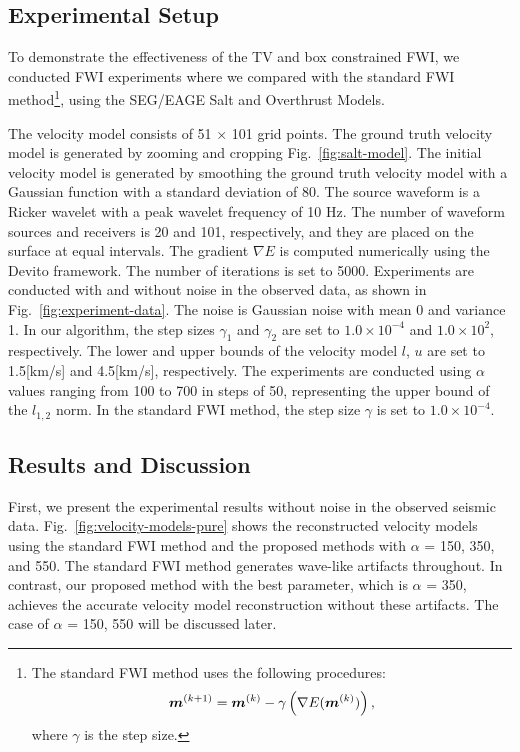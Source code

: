 \subsection{Experimental Setup} \label{subsec:experimental-setup}

To demonstrate the effectiveness of the TV and box constrained FWI, we conducted FWI experiments where we compared with the standard FWI method\footnote{
    \parbox{\linewidth}{The standard FWI method uses the following procedures:
        \begin{equation} \label{eq:FWIWithGradient} \FWIWithGradient, \end{equation}
        where $\gamma$ is the step size.}
}\cite{FWI0}, using the SEG/EAGE Salt and Overthrust Models.

The velocity model consists of 51 $\times$ 101 grid points.
The ground truth velocity model is generated by zooming and cropping Fig.~\ref{fig:salt-model}.
The initial velocity model is generated by smoothing the ground truth velocity model with a Gaussian function with a standard deviation of 80.
The source waveform is a Ricker wavelet with a peak wavelet frequency of 10 Hz.
The number of waveform sources and receivers is 20 and 101, respectively, and they are placed on the surface at equal intervals.
The gradient $\nabla E$ is computed numerically using the Devito framework\cite{devito}.
The number of iterations is set to 5000.
Experiments are conducted with and without noise in the observed data, as shown in Fig.~\ref{fig:experiment-data}.
The noise is Gaussian noise with mean 0 and variance 1.
In our algorithm, the step sizes $\gamma_1$ and $\gamma_2$ are set to $1.0 \times 10^{-4}$ and $1.0 \times 10^2$, respectively.
The lower and upper bounds of the velocity model $l$, $u$ are set to 1.5[km/s] and 4.5[km/s], respectively.
The experiments are conducted using $\alpha$ values ranging from 100 to 700 in steps of 50, representing the upper bound of the $l_{1,2}$ norm.
In the standard FWI method, the step size $\gamma$ is set to $1.0 \times 10^{-4}$.











\subsection{Results and Discussion} \label{subsec:results-and-discussion}
First, we present the experimental results without noise in the observed seismic data.
Fig.~\ref{fig:velocity-models-pure} shows the reconstructed velocity models using the standard FWI method and the proposed methods with $\alpha$ = 150, 350, and 550.
The standard FWI method generates wave-like artifacts throughout.
In contrast, our proposed method with the best parameter, which is $\alpha$ = 350, achieves the accurate velocity model reconstruction without these artifacts.
The case of $\alpha$ = 150, 550 will be discussed later.

